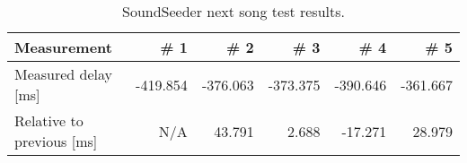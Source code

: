\begin{table}[ht]
\centering
\begin{tabularx}{0.9\textwidth}{Xrrrrr}
\toprule
Measurement          		& \# 1     	& \# 2     	& \# 3     & \# 4     & \# 5     \\ \midrule
Measured delay [ms]       	& -419.854 	& -376.063 	& -373.375 & -390.646 & -361.667 \\
Relative to previous [ms] 	& N/A     	& 43.791 	& 2.688  & -17.271  & 28.979  \\ \bottomrule
\end{tabularx}
\caption{SoundSeeder next song test results.}
\label{fig:soundseedernextsongfigure}
\end{table}
